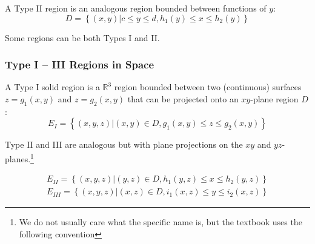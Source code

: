 \documentclass{article}
\begin{document}
A Type II region is an analogous region bounded between functions of $y$:
$$D=\left\{(x,y)|c\le y\le d, h_1(y)\le x\le h_2(y)\right\}$$

Some regions can be both Types I and II.

\subsubsection{Type I -- III Regions in Space}
A Type I solid region is a $\mathbb{R}^3$ region bounded between two (continuous) surfaces $z=g_1(x,y)$ and $z=g_2(x,y)$ that can be projected onto an $xy$-plane region $D$:
$$E_I=\left\{(x,y,z)|(x,y)\in D, g_1(x,y)\le z \le g_2(x,y)\right\}$$

Type II and III are analogous but with plane projections on the $xy$ and $yz$-planes.\footnote{We do not usually care what the specific name is, but the textbook uses the following convention}

\begin{align*}
E_{II}=\left\{(x,y,z)|(y,z)\in D, h_1(y,z)\le x \le h_2(y,z)\right\}\\
E_{III}=\left\{(x,y,z)|(x,z)\in D, i_1(x,z)\le y \le i_2(x,z)\right\}
\end{align*}
\end{document}
